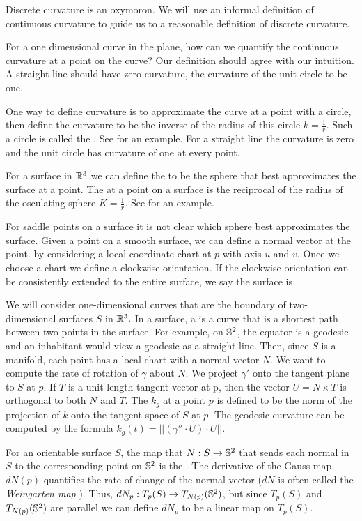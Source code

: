 
Discrete curvature is an oxymoron.
We will use an informal definition of continuous curvature to guide
us to a reasonable definition of discrete curvature. 


For a one dimensional curve in the plane,
 how can we quantify the continuous curvature at a point on the curve?
Our definition should agree with our intuition. A straight line
should have zero curvature, the curvature of the unit circle to be one.

One way to define curvature is to approximate the curve at a point with a circle,
 then define the curvature to be the inverse of the radius of this circle $k=\frac{1}{r}$.
Such a circle is called the .
See  for an example.
For a straight line the curvature is zero and the unit circle has curvature of one
at every point.

For a surface in $\mathbb{R}^3$ we can define the 
to be the sphere that best approximates the surface at a point.
The  at a point on a surface is the
reciprocal of the radius of the osculating sphere $K=\frac{1}{r}.$
See  for an example.

For saddle points on a surface it is not clear which sphere
best approximates the surface.
Given a point on a smooth surface, we can define a normal vector at the point.
by considering a local coordinate chart at $p$ with axis $u$ and $v$.
Once we choose a chart we define a clockwise orientation. If the clockwise
orientation can be consistently extended to the entire surface, we say
the surface is .



We will consider one-dimensional curves that are the boundary of two-dimensional
surfaces $S$ in $\mathbb{R}^3.$ In a surface, a  is a curve that is a shortest path
between two points in the surface. For example, on $\mathbb{S}^2$, the equator is a geodesic
and an inhabitant would view a geodesic as a straight line. 
Then, since $S$ is a manifold, each point has a local chart with a normal vector $N$.
We want to compute the rate of rotation of $\gamma$ about $N$.
We project $\gamma'$ onto the tangent plane to $S$ at $p$.
If $T$ is a unit length tangent vector at p, then the vector $U=N\times T$
is orthogonal to both $N$ and $T$.
The  $k_g$ at a point $p$ is defined to be the norm of the projection
of $k$ onto the tangent space of $S$ at $p$. The geodesic curvature can be computed
by the formula $k_g(t)=||(\gamma''\cdot U)\cdot U||.$




For an orientable surface $S$, the map that  $N:S\to \mathbb{S}^2$ that sends each
normal in $S$ to the corresponding point on $\mathbb{S}^2$ is
the .
The derivative of the Gauss map, $dN(p)$ quantifies the rate of change of
the normal vector ($dN$ is often called the \emph{Weingarten map} \cite{Crane:2013}).
Thus, $dN_p:T_p(S)\to T_{N(p)}(\mathbb{S}^2)$, but since $T_p(S)$ and $T_{N(p)}(\mathbb{S}^2)$
are parallel we can define $dN_p$ to be a linear map on $T_p(S)$.









